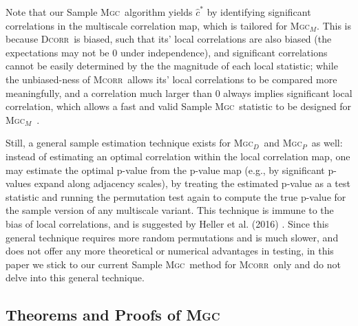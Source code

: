 \documentclass[11pt]{article}
\providecommand{\sct}[1]{{\normalfont\textsc{#1}}}
\newcommand{\G}{c}
\newcommand{\Mgc}{\sct{Mgc}}
\newcommand{\Mgcp}{\sct{Mgc$_P$}}
\newcommand{\Mgcd}{\sct{Mgc$_D$}}
\newcommand{\Mgcm}{\sct{Mgc$_M$}}
\newcommand{\Dcorr}{\sct{Dcorr}}
\newcommand{\Mcorr}{\sct{Mcorr}}
\newcommand{\Mantel}{\sct{Mantel}}
\begin{document}

Note that our Sample \Mgc~algorithm yields $\hat{\G}^{*}$ by identifying significant correlations in the multiscale correlation map, which is tailored for \Mgcm. This is because \Dcorr~is biased, such that its' local correlations are also biased (the expectations may not be $0$ under independence), and significant correlations cannot be easily determined by the the magnitude of each local statistic; while the unbiased-ness of \Mcorr~allows its' local correlations to be compared more meaningfully, and a correlation much larger than $0$ always implies significant local correlation, which allows a fast and valid Sample \Mgc~statistic to be designed for \Mgcm~. 

Still, a general sample estimation technique exists for \Mgcd~and \Mgcp~as well: instead of estimating an optimal correlation within the local correlation map, one may estimate the optimal p-value from the p-value map (e.g., by significant p-values expand along adjacency scales), by treating the estimated p-value as a test statistic and running the permutation test again to compute the true p-value for the sample version of any multiscale variant. This technique is immune to the bias of local correlations, and is suggested by Heller et al. (2016) \cite{heller2016consistent}. Since this general technique requires more random permutations and is much slower, and does not offer any more theoretical or numerical advantages in testing, in this paper we stick to our current Sample \Mgc~method for \Mcorr~only and do not delve into this general technique.

\subsection{Theorems and Proofs of \Mgc}
\label{appen:theory}
\end{document}
